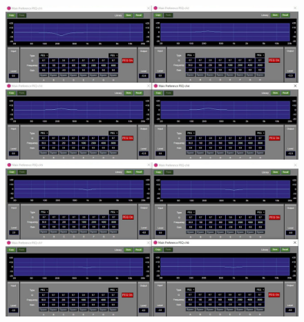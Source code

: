 \documentclass[11pt,a4j]{jreport}
\begin{document}
\newpage
{}
\begin{figure}[H]
  \begin{minipage}[b]{.5\linewidth}
    \centering
    \includegraphics[width=.9\linewidth]{images/experimentField/afcParameters/base05manualEQ2_1.jpg}
  \end{minipage}%
  \begin{minipage}[b]{.5\linewidth}
    \centering
    \includegraphics[width=.9\linewidth]{images/experimentField/afcParameters/base05manualEQ2_2.jpg}
  \end{minipage}


\end{figure}
\end{document}
